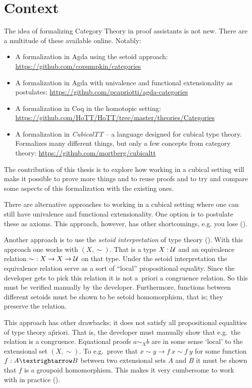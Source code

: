 \section{Context}
\label{sec:context}
%
The idea of formalizing Category Theory in proof assistants is not new. There
are a multitude of these available online. Notably:
%
\begin{itemize}
\item
  A formalization in Agda using the setoid approach:
  \url{https://github.com/copumpkin/categories}
\item
  A formalization in Agda with univalence and functional
  extensionality as postulates:
  \url{https://github.com/pcapriotti/agda-categories}
\item
  A formalization in Coq in the homotopic setting:
  \url{https://github.com/HoTT/HoTT/tree/master/theories/Categories}
\item
  A formalization in \emph{CubicalTT} -- a language designed for
  cubical type theory. Formalizes many different things, but only a
  few concepts from category theory:
  \url{https://github.com/mortberg/cubicaltt}
\end{itemize}
%
The contribution of this thesis is to explore how working in a cubical setting
will make it possible to prove more things and to reuse proofs and to try and
compare some aspects of this formalization with the existing ones.

There are alternative approaches to working in a cubical setting where
one can still have univalence and functional extensionality. One
option is to postulate these as axioms. This approach, however, has
other shortcomings, e.g. you lose 
(\cite[p. 3]{huber-2016}).

Another approach is to use the \emph{setoid interpretation} of type
theory (\cite{hofmann-1995,huber-2016}). With this approach one works
with  $(X, \sim)$. That is a type $X \mathrel{:}
\mathcal{U}$ and an equivalence relation $\sim\ \mathrel{:} X \to X \to \mathcal{U}$ on that
type. Under the setoid interpretation the equivalence relation serve
as a sort of ``local'' propositional equality. Since the developer
gets to pick this relation it is not a~priori a congruence
relation. So this must be verified manually by the developer.
Furthermore, functions between different setoids must be shown to be
setoid homomorphism, that is; they preserve the relation.

This approach has other drawbacks; it does not satisfy all
propositional equalities of type theory a\~priori. That is, the
developer must manually show that e.g.\ the relation is a congruence.
Equational proofs $a \sim_{X} b$ are in some sense `local' to the
extensional set $(X , \sim)$. To e.g.\ prove that $x ∼ y → f\ x ∼
f\ y$ for some function $f \tp A → B$ between two extensional sets $A$
and $B$ it must be shown that $f$ is a groupoid homomorphism. This
makes it very cumbersome to work with in practice (\cite[p.
  4]{huber-2016}).

